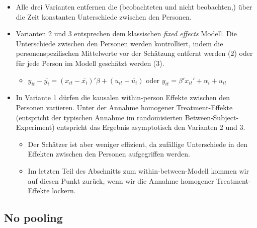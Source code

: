 \documentclass[]{book}
\providecommand{\tightlist}{%
  \setlength{\itemsep}{0pt}\setlength{\parskip}{0pt}}
\begin{document}
\begin{itemize}
\tightlist
\item
  Alle drei Varianten entfernen die (beobachteten und nicht beobachten,) über die Zeit konstanten Unterschiede zwischen den Personen.
\item
  Varianten 2 und 3 entsprechen dem klassischen \emph{fixed effects} Modell. Die Unterschiede zwischen den Personen werden kontrolliert, indem die personenspezifischen Mittelwerte vor der Schätzung entfernt werden (2) oder für jede Person im Modell geschätzt werden (3).

  \begin{itemize}
  \tightlist
  \item
    \(y_{it}-\bar{y_{i}} = (x_{it} - \bar{x_{i}})'\beta + (u_{it} - \bar{u_{i}})\) oder \(y_{it} = \beta' x_{it}' + \alpha_i + u_{it}\)
  \end{itemize}
\item
  In Variante 1 dürfen die kausalen within-person Effekte zwischen den Personen variieren. Unter der Annahme homogener Treatment-Effekte (entspricht der typischen Annahme im randomisierten Between-Subject-Experiment) entspricht das Ergebnis asymptotisch den Varianten 2 und 3.

  \begin{itemize}
  \tightlist
  \item
    Der Schätzer ist aber weniger effizient, da zufällige Unterschiede in den Effekten zwischen den Personen aufgegriffen werden.
  \item
    Im letzten Teil des Abschnitts zum within-between-Modell kommen wir auf diesen Punkt zurück, wenn wir die Annahme homogener Treatment-Effekte lockern.
  \end{itemize}
\end{itemize}

\hypertarget{no-pooling}{%
\subsection*{No pooling}\label{no-pooling}}
\end{document}
